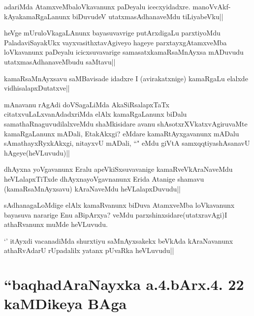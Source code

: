 \begin{artha}
adariMda AtamxveMbaloVkavanunx paDeyalu icecxyidadxre. manoVvAkf-kAyakamaRgaLanunx biDuvudeV utatxmasAdhanaveMdu tiLiyabeVku||
\end{artha}

\begin{artha}
heVge mUruloVkagaLAnunx bayasuvavrige putArxdigaLu parxtiyoMdu PaladaviSayakUkx vayxvasithxtavAgiveyo hageye parxtayxgAtamxveMba loVkavanunx paDeyalu icicxsuvavarige samasatxkamaRsaMnAyxsa mADuvudu utatxmasAdhanaveMbudu saMtavu||
\end{artha}

\begin{artha}
kamaRsaMnAyxsavu saMBavisade idadxre I (avirakatxnige) kamaRgaLu elalxde vidhisalapxDutatxve||
\end{artha}

\begin{artha}
mAnavanu rAgAdi doVSagaLiMda AkaSiRsalapxTaTx citatxvuLaLxvanAdadxriMda elAlx kamaRgaLanunx biDalu samathaRnaguvudilalxveMdu shaMkisidare avanu shAsotxrXVkatxvAgiruvaMte kamaRgaLanunx mADali, EtakAkxgi? eMdare kamaRtAyxgavanunx mADalu sAmathayxRyxkAkxgi, nitayxvU mADali, ``\stext" eMdu giVtA samxqqtiyashAsanavU hAgeye(heVLuvudu)||
\end{artha}

\begin{artha}
dhAyxna yoVgavanunx Eralu apeVkiSxsuvavanige kamaRveVkAraNaveMdu heVLalapxTiTxde dhAyxnayoVgavnanunx Erida Atanige shamavu (kamaRsaMnAyxsavu) kAraNaveMdu heVLalapxDuvudu||
\end{artha}


\begin{artha}
sAdhanagaLoMdige elAlx kamaRvanunx biDuva AtamxveMba loVkavanunx bayasuva nararige Enu aBipArxya? veMdu parxshinxsidare(utatxravAgi)I athaRvanunx muMde heVLuvudu.
\end{artha}

\begin{artha}
`\stext' itAyxdi vacanadiMda shurxtiyu saMnAyxsakekx beVkAda kAraNavanunx athaRvAdarU rUpadalilx yatanx pUvaRka heVLuvudu||
\end{artha}

\section*{``baqhadAraNayxka a.4.bArx.4. 22 kaMDikeya BAga}

